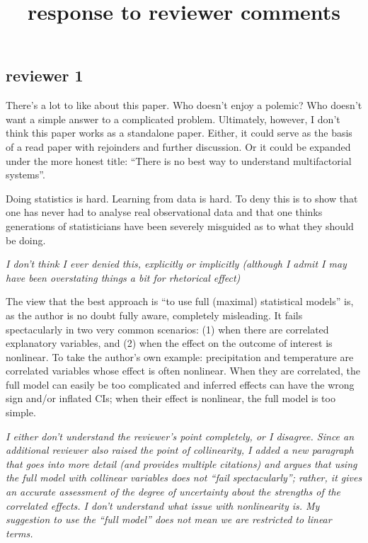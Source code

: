 \documentclass[12pt]{article}
\title{response to reviewer comments}
\author{}
\date{}
\begin{document}
\maketitle

\subsection{reviewer 1}\label{reviewer-1}

There's a lot to like about this paper. Who doesn't enjoy a polemic? Who
doesn't want a simple answer to a complicated problem. Ultimately,
however, I don't think this paper works as a standalone paper. Either,
it could serve as the basis of a read paper with rejoinders and further
discussion. Or it could be expanded under the more honest title: ``There
is no best way to understand multifactorial systems''.

Doing statistics is hard. Learning from data is hard. To deny this is to
show that one has never had to analyse real observational data and that
one thinks generations of statisticians have been severely misguided as
to what they should be doing.

\emph{I don't think I ever denied this, explicitly or implicitly
(although I admit I may have been overstating things a bit for
rhetorical effect)}

The view that the best approach is ``to use full (maximal) statistical
models'' is, as the author is no doubt fully aware, completely
misleading. It fails spectacularly in two very common scenarios: (1)
when there are correlated explanatory variables, and (2) when the effect
on the outcome of interest is nonlinear. To take the author's own
example: precipitation and temperature are correlated variables whose
effect is often nonlinear. When they are correlated, the full model can
easily be too complicated and inferred effects can have the wrong sign
and/or inflated CIs; when their effect is nonlinear, the full model is
too simple.

\emph{I either don't understand the reviewer's point completely, or I
disagree. Since an additional reviewer also raised the point of
collinearity, I added a new paragraph that goes into more detail (and
provides multiple citations) and argues that using the full model with
collinear variables does not ``fail spectacularly''; rather, it gives an
accurate assessment of the degree of uncertainty about the strengths of
the correlated effects. I don't understand what issue with nonlinearity
is. My suggestion to use the ``full model'' does not mean we are
restricted to linear terms.}
\end{document}
